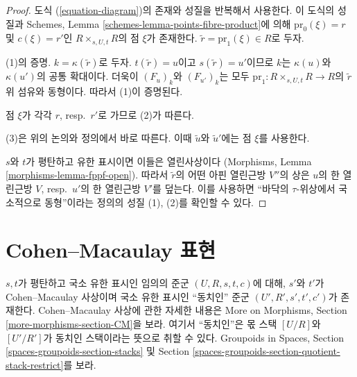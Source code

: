 \begin{proof}
도식 (\ref{equation-diagram})의 존재와 성질을 반복해서 사용한다.
이 도식의 성질과 Schemes, Lemma
\ref{schemes-lemma-points-fibre-product}에 의해
$\text{pr}_0(\xi) = r$ 및 $c(\xi) = r'$인
$R \times_{s, U, t} R$의 점 $\xi$가 존재한다.
$\tilde r = \text{pr}_1(\xi) \in R$로 두자.

\medskip\noindent
(1)의 증명. $k = \kappa(\tilde r)$로 두자. $t(\tilde r) = u$이고
$s(\tilde r) = u'$이므로 $k$는 $\kappa(u)$와 $\kappa(u')$의 공통 확대이다.
더욱이 $(F_u)_k$와 $(F_{u'})_k$는 모두
$\text{pr}_1 : R \times_{s, U, t} R \to R$의 $\tilde r$ 위 섬유와
동형이다. 따라서 (1)이 증명된다.

\medskip\noindent
점 $\xi$가 각각 $r$, resp.\ $r'$로 가므로 (2)가 따른다.

\medskip\noindent
(3)은 위의 논의와 정의에서 바로 따른다. 이때 $\tilde u$와
$\tilde u'$에는 점 $\xi$를 사용한다.

\medskip\noindent
$s$와 $t$가 평탄하고 유한 표시이면 이들은 열린사상이다
(Morphisms, Lemma \ref{morphisms-lemma-fppf-open}). 따라서
$\tilde r$의 어떤 아핀 열린근방 $V''$의 상은 $u$의 한 열린근방
$V$, resp.\ $u'$의 한 열린근방 $V'$를 덮는다. 이를 사용하면
``바닥의 $\tau$-위상에서 국소적으로 동형''이라는 정의의 성질
(1), (2)를 확인할 수 있다.
\end{proof}







\section{Cohen--Macaulay 표현}
\label{section-CM}

\noindent
$s, t$가 평탄하고 국소 유한 표시인 임의의 준군 $(U, R, s, t, c)$에 대해,
$s'$와 $t'$가 Cohen--Macaulay 사상이며 국소 유한 표시인 ``동치인'' 준군
$(U', R', s', t', c')$가 존재한다. Cohen--Macaulay 사상에 관한 자세한
내용은 More on Morphisms, Section \ref{more-morphisms-section-CM}을 보라.
여기서 ``동치인''은 몫 스택 $[U/R]$와 $[U'/R']$가 동치인 스택이라는
뜻으로 취할 수 있다. Groupoids in Spaces, Section
\ref{spaces-groupoids-section-stacks} 및 Section
\ref{spaces-groupoids-section-quotient-stack-restrict}를 보라.

